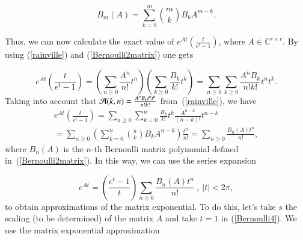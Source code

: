 \documentclass[preprint,10pt,numbers,sort&compress]{elsarticle}
\begin{document}
\begin{equation}\label{Bernoulli2matrix}
B_m(A)=\sum_{k=0}^{m} {m \choose k} B_k A^{m-k}.
\end{equation}

Thus, we can now calculate the exact value of $\displaystyle e^{At}\left(\frac{t}{e^t-1}\right)$, where $A \in \mathbb{C}^{r \times r}$.
By using (\ref{rainville}) and (\ref{Bernoulli2matrix}) one gets

\begin{displaymath}
e^{At}\left( \frac{t}{e^t-1} \right) 
= \left(\sum_{n \geq 0} \frac{A^n}{n!}t^n \right) \left(\sum_{k \geq 0} \frac{B_k}{k!}t^k \right) 
= \sum_{n \geq 0} \sum_{k \geq 0} \frac{A^n B_k}{n! k!}t^n t^k. 
\end{displaymath}
Taking into account that 
${\cal A}(k, n) = \frac{A^nB_kt^nt^n}{n!k!}$ from~(\ref{rainville}), we have
\begin{eqnarray*}
e^{At}\left( \frac{t}{e^t-1} \right) 
= \sum_{n \geq 0}\sum_{k=0}^{n} \frac{B_k}{k!}t^k \frac{A^{n-k}}{(n-k)!}t^{n-k} \\
= \sum_{n \geq 0}\left(\sum_{k=0}^{n}{n \choose k} B_k A^{n-k} \right) \frac{t^{n}}{n!}
= \sum_{n \geq 0} \frac{ B_n(A) t^{n}}{n!},
\end{eqnarray*}
where $B_n(A)$ is the $n$-th Bernoulli matrix polynomial defined in~(\ref{Bernoulli2matrix}). In this way, we can use the series expansion

\begin{equation}\label{Bernoulli4}
e^{At} = \left(\frac{e^t-1}{t}\right)\sum_{n \geq 0} \frac{ B_n(A) t^{n}}{n!} \ , \ |t|<2\pi,
\end{equation}
to obtain approximations of the matrix exponential. To do this, let's take $s$ the scaling (to be determined) of the matrix $A$ and take $t=1$ in (\ref{Bernoulli4}). We use the matrix exponential  approximation
\end{document}
